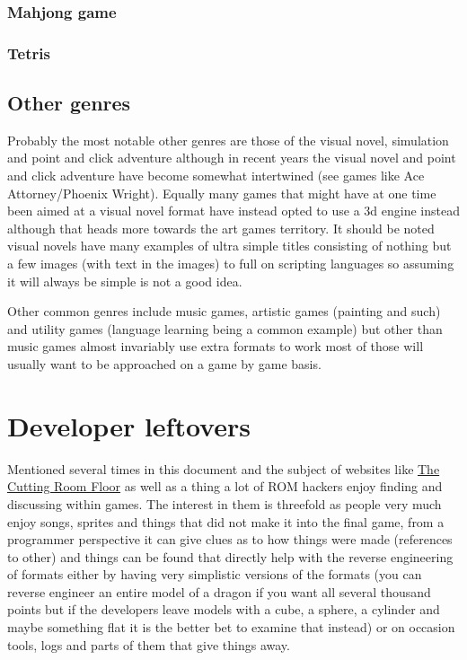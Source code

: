 \documentclass[
]{book}
\begin{document}
\hypertarget{mahjong-game}{%
\subsection{Mahjong game}\label{mahjong-game}}

\hypertarget{tetris}{%
\subsection{Tetris}\label{tetris}}

\hypertarget{other-genres}{%
\section{Other genres}\label{other-genres}}

Probably the most notable other genres are those of the visual novel, simulation and point and click adventure although in recent years the visual novel and point and click adventure have become somewhat intertwined (see games like Ace Attorney/Phoenix Wright). Equally many games that might have at one time been aimed at a visual novel format have instead opted to use a 3d engine instead although that heads more towards the art games territory. It should be noted visual novels have many examples of ultra simple titles consisting of nothing but a few images (with text in the images) to full on scripting languages so assuming it will always be simple is not a good idea.

Other common genres include music games, artistic games (painting and such) and utility games (language learning being a common example) but other than music games almost invariably use extra formats to work most of those will usually want to be approached on a game by game basis.

\hypertarget{developer-leftovers}{%
\chapter{Developer leftovers}\label{developer-leftovers}}

Mentioned several times in this document and the subject of websites like \href{http://tcrf.net/The_Cutting_Room_Floor}{The Cutting Room Floor} as well as a thing a lot of ROM hackers enjoy finding and discussing within games. The interest in them is threefold as people very much enjoy songs, sprites and things that did not make it into the final game, from a programmer perspective it can give clues as to how things were made (references to other) and things can be found that directly help with the reverse engineering of formats either by having very simplistic versions of the formats (you can reverse engineer an entire model of a dragon if you want all several thousand points but if the developers leave models with a cube, a sphere, a cylinder and maybe something flat it is the better bet to examine that instead) or on occasion tools, logs and parts of them that give things away.
\end{document}
